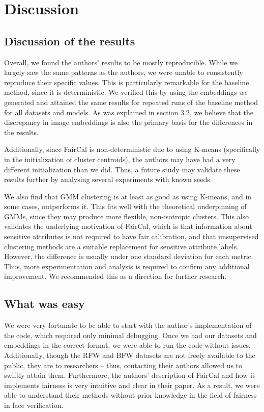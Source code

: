 \section{Discussion}

\subsection{Discussion of the results}
Overall, we found the authors' results to be mostly reproducible. While we largely saw the same patterns as the authors, we were unable to consistently reproduce their specific values. This is particularly remarkable for the baseline method, since it is deterministic. We verified this by using the embeddings \textit{we} generated and attained the same results for repeated runs of the baseline method for all datasets and models. As was explained in section 3.2, we believe that the discrepancy in image embeddings is also the primary basis for the differences in the results. 

Additionally, since FairCal is non-deterministic due to using K-means (specifically in the initialization of cluster centroids), the authors may have had a very different initialization than we did. Thus, a future study may validate these results further by analysing several experiments with known seeds.

We also find that GMM clustering is at least as good as using K-means, and in some cases, outperforms it. This fits well with the theoretical underpinning of GMMs, since they may produce more flexible, non-isotropic clusters. This also validates the underlying motivation of FairCal, which is that information about sensitive attributes is not required to have fair calibration, and that unsupervised clustering methods are a suitable replacement for sensitive attribute labels. However, the difference is usually under one standard deviation for each metric. Thus, more experimentation and analysis is required to confirm any additional improvement. We recommended this as a direction for further research.






\subsection{What was easy}
We were very fortunate to be able to start with the author's implementation of the code, which required only minimal debugging. Once we had our datasets and embeddings in the correct format, we were able to run the code without issues. Additionally, though the RFW and BFW datasets are not freely available to the public, they are to researchers -- thus, contacting their authors allowed us to swiftly attain them. Furthermore, the authors' description of FairCal and how it implements fairness is very intuitive and clear in their paper. As a result, we were able to understand their methods without prior knowledge in the field of fairness in face verification.


